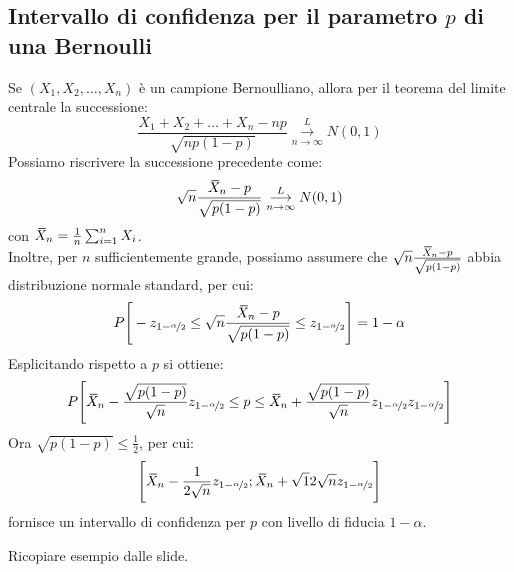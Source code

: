 \documentclass[12pt]{report}
\newcommand{\wbar}[1]{%
	\accentset{\mbox{\rule{0.55em}{0.5pt}}}{#1}%
}
\begin{document}
	 \subsection{Intervallo di confidenza per il parametro $p$ di una Bernoulli}
		Se $(X_1, X_2, \dots, X_n)$ è un campione Bernoulliano, allora per il teorema del limite centrale la successione:
		\[
		\frac{X_1 + X_2 + \dots + X_n - np}{\sqrt{np(1-p)}} \overset{L}{\underset{n\to\infty}{\longrightarrow}} N(0, 1)
		\]
		Possiamo riscrivere la successione precedente come:
		\[
		\sqrt{n}\frac{\wbar{X}_n - p}{\sqrt{p(1-p)}} \overset{L}{\underset{n\to\infty}{\longrightarrow}} N(0, 1)
		\]
		con $\wbar{X}_n = \frac{1}{n}\sum_{i=1}^{n}X_i$. \\
		Inoltre, per $n$ sufficientemente grande, possiamo assumere che $\sqrt{n}\frac{\wbar{X}_n - p}{\sqrt{p(1-p)}}$ abbia distribuzione normale standard, per cui:
		\[
		P\Bigg[-z_{1 - \nicefrac{\alpha}{2}} \leq \sqrt{n}\frac{\wbar{X}_n - p}{\sqrt{p(1-p)}} \leq z_{1 - \nicefrac{a}{2}}\Bigg] = 1 - \alpha
		\]
		Esplicitando rispetto a $p$ si ottiene:
		\[
		P\Bigg[\wbar{X}_n - \frac{\sqrt{p(1-p)}}{\sqrt{n}}z_{1 - \nicefrac{\alpha}{2}} \leq p \leq \wbar{X}_n + \frac{\sqrt{p(1-p)}}{\sqrt{n}}z_{1 - \nicefrac{\alpha}{2}}z_{1 - \nicefrac{\alpha}{2}}\Bigg]
		\]
		Ora $\sqrt{p(1-p)} \leq \frac{1}{2}$, per cui:
		\[
		\Bigg[\wbar{X}_n - \frac{1}{2\sqrt{n}}z_{1 - \nicefrac{\alpha}{2}}; \wbar{X}_n + \sqrt{1}{2\sqrt{n}}z_{1 - \nicefrac{\alpha}{2}}\Bigg]
		\]
		fornisce un intervallo di confidenza per $p$ con livello di fiducia $1 - \alpha$.
		\begin{example}{}{}
		Ricopiare esempio dalle slide.
		\end{example}
\end{document}
